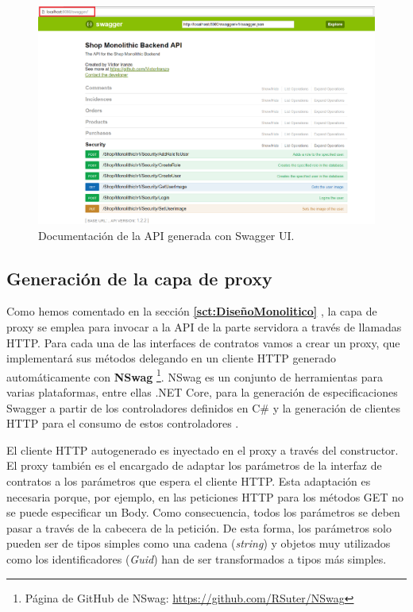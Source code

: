 \documentclass[11pt,spanish,listoffigures]{tfgetsinf}
\begin{document}
\begin{figure}[h]
\centering
\includegraphics[scale=0.4]{SwaggerAPI}
\caption{Documentación de la API generada con Swagger UI.}
\label{fig:SwaggerAPI}
\end{figure}

\subsection{Generación de la capa de proxy}

Como hemos comentado en la sección \textbf{\ref{sct:DiseñoMonolitico} }, la capa de proxy se emplea para invocar a la API de la parte servidora a través de llamadas HTTP. Para cada una de las interfaces de contratos vamos a crear un proxy, que implementará sus métodos delegando en un cliente HTTP generado automáticamente con \textbf{NSwag} \footnote{ Página de GitHub de NSwag: \url{https://github.com/RSuter/NSwag}}. NSwag es un conjunto de herramientas para varias plataformas, entre ellas .NET Core, para la generación de especificaciones Swagger a partir de los controladores definidos en C\# y la generación de clientes HTTP para el consumo de estos controladores \cite{Suter2017}.

El cliente HTTP autogenerado es inyectado en el proxy a través del constructor. El proxy también es el encargado de adaptar los parámetros de la interfaz de contratos a los parámetros que espera el cliente HTTP. Esta adaptación es necesaria porque, por ejemplo, en las peticiones HTTP para los métodos GET no se puede especificar un Body. Como consecuencia, todos los parámetros se deben pasar a través de la cabecera de la petición. De esta forma, los parámetros solo pueden ser de tipos simples como una cadena (\textit{string}) y objetos muy utilizados como los identificadores (\textit{Guid}) han de ser transformados a tipos más simples. 
\end{document}
